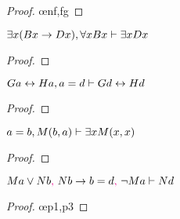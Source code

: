 \begin{earg}
\begin{minipage}{0.99\textwidth}
\begin{proof}
	 \pr{}
	 \pr{}
	\open
		 \as{}
		 
		 \oe{nf,fg}
		 
	\close
	 
\end{proof}
\bigskip
\end{minipage}

\noindent\begin{minipage}{0.99\textwidth}
\item $\exists x(Bx \rightarrow Dx), \forall xBx \vdash \exists xDx$

\begin{proof}
	 \pr{}
	 \pr{}
	\open
		 \as{}
		 
		 
		 
	\close
	 
\end{proof}
\bigskip
\end{minipage}

\item $Ga \leftrightarrow Ha, a=d \vdash Gd \leftrightarrow Hd$

\begin{proof}
	 \pr{}
	 \pr{}
	 
\end{proof}
\bigskip

\noindent\begin{minipage}{0.99\textwidth}
\item $a=b, M(b,a) \vdash \exists xM(x,x)$

\begin{proof}
	 \pr{}
	 \pr{}
	 
	 
\end{proof}
\smallskip
\end{minipage}

\noindent\begin{minipage}{0.99\textwidth}
\item $Ma \vee Nb\textcolor{magenta}{,}~ Nb \rightarrow b=d\textcolor{magenta}{,}~ {\neg} Ma  \vdash Nd$

\begin{proof}
	 \pr{}
	 \pr{}
	 \pr{}
	 \oe{p1,p3}
	 
	 
\end{proof}
\medskip
\end{minipage}


\end{earg}
